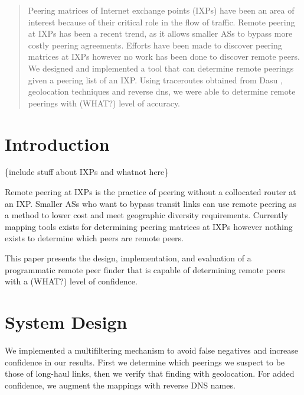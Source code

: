 \documentclass{acm_proc_article-sp}
\begin{document}
\maketitle
\begin{abstract}
Peering matrices of Internet exchange points (IXPs) have been an area of interest because of their
critical role in the flow of traffic. \cite{Augustin:2009}
Remote peering at IXPs has been a recent trend, as it allows smaller ASs to bypass more costly 
peering agreements.
Efforts have been made to discover peering matrices at IXPs however no work has been done 
to discover remote peers. We designed and implemented a tool that can determine remote peerings
given a peering list of an IXP. Using traceroutes obtained from Dasu \cite{Sanchez:2011}, geolocation
techniques and reverse dns, we were able to determine remote peerings with 
(WHAT?) level of accuracy.
\end{abstract}




\section{Introduction}

\{include stuff about IXPs and whatnot here\}

Remote peering at IXPs is the practice of peering without a collocated router at an IXP. Smaller ASs
who want to bypass transit links can use remote peering as a method to lower cost and meet geographic 
diversity requirements. Currently mapping tools exists for determining peering matrices at 
IXPs however nothing exists to determine which peers are remote peers.

This paper presents the design, implementation, and evaluation of a programmatic remote peer finder
that is capable of determining remote peers with a (WHAT?) level of confidence. 



\section{System Design}
We implemented a multifiltering mechanism to avoid false negatives and increase confidence in our results.
First we determine which peerings we suspect to be those of long-haul links, 
then we verify that finding with geolocation. For added confidence,
we augment the mappings with reverse DNS names. 
\end{document}

